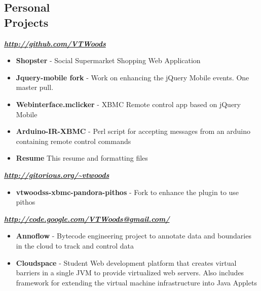 \documentclass[line,margin]{res}
\begin{document}
\begin{resume}
\section{Personal \\ Projects}
\textbf{\emph{\url{http://github.com/VTWoods}}}
\begin{itemize} \itemsep -2pt %
\item \textbf{Shopster} - Social Supermarket Shopping Web Application
\item \textbf{Jquery-mobile fork} - Work on enhancing the jQuery Mobile events. One master pull.
\item \textbf{Webinterface.mclicker} - XBMC Remote control app based on jQuery Mobile 
\item \textbf{Arduino-IR-XBMC} - Perl script for accepting messages from an arduino containing remote control commands
\item \textbf{Resume} This resume and formatting files
\end{itemize}
\textbf{\emph{\url{http://gitorious.org/~vtwoods}}}
\begin{itemize} \itemsep -2pt %
\item \textbf{vtwoodss-xbmc-pandora-pithos} - Fork to enhance the plugin to use pithos
\end{itemize}
\textbf{\emph{\url{http://code.google.com/VTWoods@gmail.com/}}}
\begin{itemize} \itemsep -2pt %
\item \textbf{Annoflow} - Bytecode engineering project to annotate data and boundaries in the cloud to track and control data
\item \textbf{Cloudspace} - Student Web development platform that creates virtual barriers in a single JVM to provide virtualized web servers.  Also includes framework for extending the virtual machine infrastructure into Java Applets
\end{itemize}


\end{resume}
\end{document}
